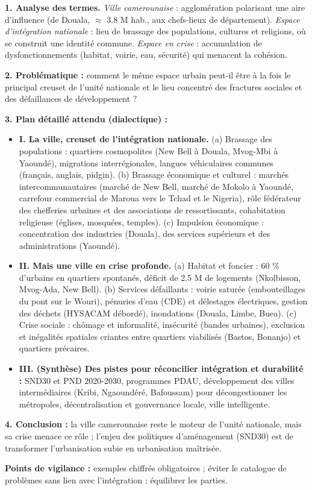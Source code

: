 \documentclass[11pt]{article}
\begin{document}
\begin{corrige}
\textbf{1. Analyse des termes.} \emph{Ville camerounaise} : agglomération polarisant une aire d'influence (de Douala, $\approx$ \num{3,8} M hab., aux chefs-lieux de département). \emph{Espace d'intégration nationale} : lieu de brassage des populations, cultures et religions, où se construit une identité commune. \emph{Espace en crise} : accumulation de dysfonctionnements (habitat, voirie, eau, sécurité) qui menacent la cohésion.

\textbf{2. Problématique :} comment le même espace urbain peut-il être à la fois le principal creuset de l'unité nationale et le lieu concentré des fractures sociales et des défaillances de développement ?

\textbf{3. Plan détaillé attendu (dialectique) :}
\begin{itemize}
    \item \textbf{I. La ville, creuset de l'intégration nationale.} (a) Brassage des populations : quartiers cosmopolites (New Bell à Douala, Mvog-Mbi à Yaoundé), migrations interrégionales, langues véhiculaires communes (français, anglais, pidgin). (b) Brassage économique et culturel : marchés intercommunautaires (marché de New Bell, marché de Mokolo à Yaoundé, carrefour commercial de Maroua vers le Tchad et le Nigeria), rôle fédérateur des chefferies urbaines et des associations de ressortissants, cohabitation religieuse (églises, mosquées, temples). (c) Impulsion économique : concentration des industries (Douala), des services supérieurs et des administrations (Yaoundé).
    \item \textbf{II. Mais une ville en crise profonde.} (a) Habitat et foncier : \num{60} \% d'urbains en quartiers spontanés, déficit de \num{2,5} M de logements (Nkolbisson, Mvog-Ada, New Bell). (b) Services défaillants : voirie saturée (embouteillages du pont sur le Wouri), pénuries d'eau (CDE) et délestages électriques, gestion des déchets (HYSACAM débordé), inondations (Douala, Limbe, Buea). (c) Crise sociale : chômage et informalité, insécurité (bandes urbaines), exclusion et inégalités spatiales criantes entre quartiers viabilisés (Bastos, Bonanjo) et quartiers précaires.
    \item \textbf{III. (Synthèse) Des pistes pour réconcilier intégration et durabilité :} SND30 et PND 2020-2030, programmes PDAU, développement des villes intermédiaires (Kribi, Ngaoundéré, Bafoussam) pour décongestionner les métropoles, décentralisation et gouvernance locale, ville intelligente.
\end{itemize}

\textbf{4. Conclusion :} la ville camerounaise reste le moteur de l'unité nationale, mais sa crise menace ce rôle ; l'enjeu des politiques d'aménagement (SND30) est de transformer l'urbanisation subie en urbanisation maîtrisée.

\textbf{Points de vigilance :} exemples chiffrés obligatoires ; éviter le catalogue de problèmes sans lien avec l'intégration ; équilibrer les parties.
\end{corrige}
\end{document}
